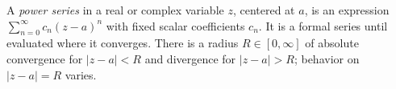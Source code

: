 
A \emph{power series} in a real or complex variable $z$, centered at $a$, is an expression $\sum_{n=0}^{\infty}c_n(z-a)^n$ with fixed scalar coefficients $c_n$. It is a formal series until evaluated where it converges. There is a radius $R\in[0,\infty]$ of absolute convergence for $|z-a|<R$ and divergence for $|z-a|>R$; behavior on $|z-a|=R$ varies.
